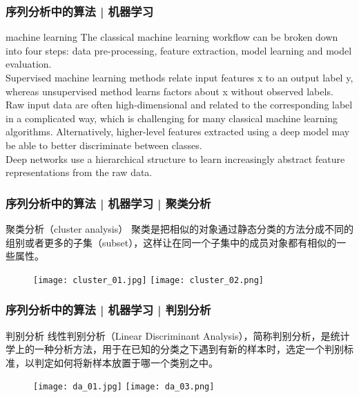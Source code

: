 \begin{frame}
  \frametitle{序列分析中的算法 | 机器学习}
  \begin{block}{machine learning}
    The classical machine learning workflow can be broken down into four steps: data pre-processing, feature extraction, model learning and model evaluation.\\
    \vspace{0.5em}
    Supervised machine learning methods relate input features x to an output label y, whereas unsupervised method learns factors about x without observed labels.\\
    \vspace{0.5em}
    Raw input data are often high-dimensional and related to the corresponding label in a complicated way, which is challenging for many classical machine learning algorithms. Alternatively, higher-level features extracted using a deep model may be able to better discriminate between classes.\\
    \vspace{0.5em}
    Deep networks use a hierarchical structure to learn increasingly abstract feature representations from the raw data.
  \end{block}
\end{frame}

\begin{frame}
  \frametitle{序列分析中的算法 | 机器学习 | 聚类分析}
  \begin{block}{聚类分析（cluster analysis）}
    聚类是把相似的对象通过静态分类的方法分成不同的组别或者更多的子集（subset），这样让在同一个子集中的成员对象都有相似的一些属性。
  \end{block}
  \begin{figure}
    \centering
    \texttt{[image: cluster\_01.jpg]}
    \texttt{[image: cluster\_02.png]}
  \end{figure}
\end{frame}

\begin{frame}
  \frametitle{序列分析中的算法 | 机器学习 | 判别分析}
  \begin{block}{判别分析}
    线性判别分析（Linear Discriminant Analysis），简称判别分析，是统计学上的一种分析方法，用于在已知的分类之下遇到有新的样本时，选定一个判别标准，以判定如何将新样本放置于哪一个类别之中。
  \end{block}
  \begin{figure}
    \centering
    \texttt{[image: da\_01.jpg]}
    \texttt{[image: da\_03.png]}
  \end{figure}
\end{frame}

